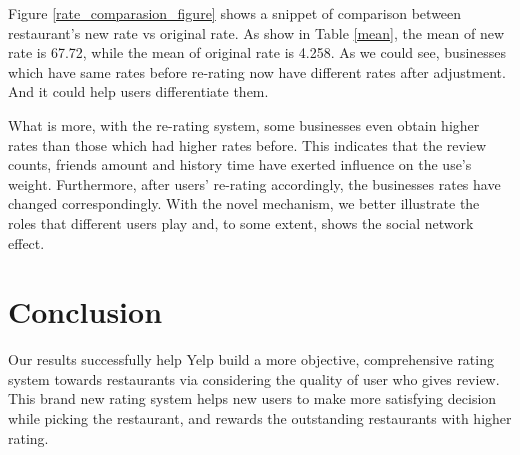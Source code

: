 \documentclass{stylefiles/capstone}
\begin{document}
Figure \ref{rate_comparasion_figure} shows a snippet of comparison between restaurant's new rate vs original rate. As show in Table \ref{mean}, the mean of new rate is 67.72, while the mean of original rate is 4.258. As we could see, businesses which have same rates before re-rating now have different rates after adjustment. And it could help users differentiate them. 

What is more, with the re-rating system, some businesses even obtain higher rates than those which had higher rates before. This indicates that the review counts, friends amount and history time have exerted influence on the use's weight. Furthermore, after users' re-rating accordingly, the businesses rates have changed correspondingly. With the novel mechanism, we better illustrate the roles that different users play and, to some extent, shows the social network effect.    

\section{Conclusion}
Our results successfully help Yelp build a more objective, comprehensive rating system towards restaurants via considering the quality of user who gives review. This brand new rating system helps new users to make more satisfying decision while picking the restaurant, and rewards the outstanding restaurants with higher rating.



\end{document}
